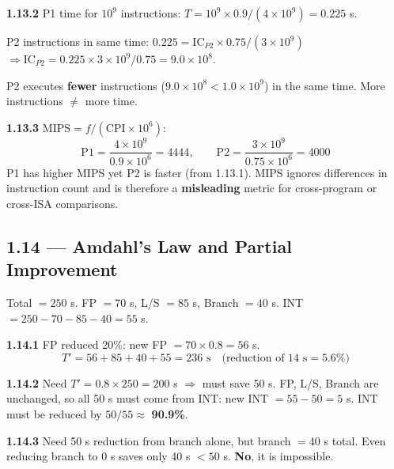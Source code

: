 \medskip\noindent\textbf{1.13.2}
P1 time for $10^9$ instructions:
$T = 10^9 \times 0.9 / (4 \times 10^9) = 0.225$ s.

P2 instructions in same time:
$0.225 = \text{IC}_{P2} \times 0.75 / (3 \times 10^9)$
$\Rightarrow \text{IC}_{P2} = 0.225 \times 3 \times 10^9 / 0.75
= 9.0 \times 10^8$.

P2 executes \textbf{fewer} instructions ($9.0 \times 10^8 < 1.0 \times 10^9$)
in the same time.  More instructions $\neq$ more time.

\medskip\noindent\textbf{1.13.3}
$\text{MIPS} = f / (\text{CPI} \times 10^6)$:
\[
  \text{P1} = \frac{4 \times 10^9}{0.9 \times 10^6} = 4444, \qquad
  \text{P2} = \frac{3 \times 10^9}{0.75 \times 10^6} = 4000
\]
P1 has higher MIPS yet P2 is faster (from 1.13.1).  MIPS ignores differences
in instruction count and is therefore a \textbf{misleading} metric for
cross-program or cross-ISA comparisons.

\subsection*{1.14 --- Amdahl's Law and Partial Improvement}
\hypertarget{sol-1.14}{}

Total $= 250$ s.  FP $= 70$ s, L/S $= 85$ s, Branch $= 40$ s.
INT $= 250 - 70 - 85 - 40 = 55$ s.

\medskip\noindent\textbf{1.14.1}
FP reduced 20\%: new FP $= 70 \times 0.8 = 56$ s.
\[
  T' = 56 + 85 + 40 + 55 = 236\text{ s} \quad
  \text{(reduction of } 14\text{ s} = 5.6\%)
\]

\noindent\textbf{1.14.2}
Need $T' = 0.8 \times 250 = 200$ s $\Rightarrow$ must save 50 s.
FP, L/S, Branch are unchanged, so all 50 s must come from INT:
new INT $= 55 - 50 = 5$ s.
INT must be reduced by $50/55 \approx$ \textbf{90.9\%}.

\medskip\noindent\textbf{1.14.3}
Need 50 s reduction from branch alone, but branch $= 40$ s total.
Even reducing branch to 0 s saves only 40 s $< 50$ s.
\textbf{No}, it is impossible.

